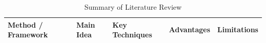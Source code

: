     {\small
        \setlength{\tabcolsep}{3pt}
        \renewcommand{\arraystretch}{1.15}
        
        \begin{longtable}{    
                >{\raggedright\arraybackslash}p{2.6cm}
                >{\raggedright\arraybackslash}p{3cm}
                >{\raggedright\arraybackslash}p{3.2cm}
                >{\raggedright\arraybackslash}p{3.2cm}
                >{\raggedright\arraybackslash}p{3.2cm}
            }
            \caption{Summary of Literature Review}
            \label{tab:lit_review_summary}                                                                                                                 \\
            
            \toprule
            \textbf{Method / Framework}                                                                                              & 
            \textbf{Main Idea}                                                                                                       & 
            \textbf{Key Techniques}                                                                                                  & 
            \textbf{Advantages}                                                                                                      & 
            \textbf{Limitations}                                                                                                                           \\
            \midrule
            \endfirsthead
            
            

\end{longtable}}
